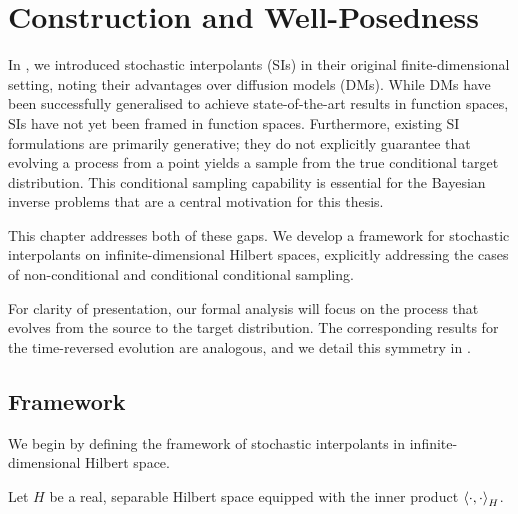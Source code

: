 \chapter{Construction and Well-Posedness}\label{cha:3}

\ifpdf
\graphicspath{{Chapter3/Figs/Raster/}{Chapter3/Figs/PDF/}{Chapter3/Figs/}}
\else
\graphicspath{{Chapter3/Figs/Vector/}{Chapter3/Figs/}}
\fi

In , we introduced stochastic interpolants (SIs) in their original finite-dimensional setting, noting their advantages over diffusion models (DMs). %
While DMs have been successfully generalised to achieve state-of-the-art results in function spaces, SIs have not yet been framed in function spaces. Furthermore, existing SI formulations are primarily generative; they do not explicitly guarantee that evolving a process from a point yields a sample from the true conditional target distribution. This conditional sampling capability is essential for the Bayesian inverse problems that are a central motivation for this thesis.

This chapter addresses both of these gaps. We develop a framework for stochastic interpolants on infinite-dimensional Hilbert spaces, explicitly addressing the cases of non-conditional and conditional conditional sampling.

For clarity of presentation, our formal analysis will focus on the process that evolves from the source to the target distribution. The corresponding results for the time-reversed evolution are analogous, and we detail this symmetry in . %


\section{Framework}

We begin by defining the framework of stochastic interpolants in infinite-dimensional Hilbert space.

\begin{definition}
  Let \(H\) be a real, separable Hilbert space equipped with the inner product \(\ev{\cdot, \cdot}_{H}\).
\end{definition}